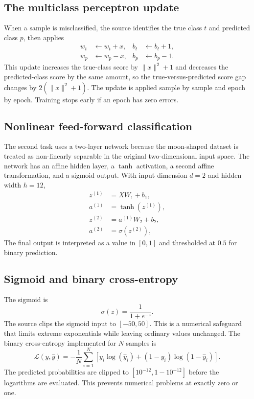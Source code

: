 \documentclass[11pt,a4paper]{article}
\begin{document}
\subsection{The multiclass perceptron update}
When a sample is misclassified, the source identifies the true class \(t\) and predicted class \(p\), then applies
\begin{align}
    w_t &\leftarrow w_t + x, & b_t &\leftarrow b_t + 1,\\
    w_p &\leftarrow w_p - x, & b_p &\leftarrow b_p - 1.
\end{align}
This update increases the true-class score by \(\lVert x\rVert^2+1\) and decreases the predicted-class score by the same amount, so the true-versus-predicted score gap changes by \(2(\lVert x\rVert^2+1)\). The update is applied sample by sample and epoch by epoch. Training stops early if an epoch has zero errors.

\subsection{Nonlinear feed-forward classification}
The second task uses a two-layer network because the moon-shaped dataset is treated as non-linearly separable in the original two-dimensional input space. The network has an affine hidden layer, a \(\tanh\) activation, a second affine transformation, and a sigmoid output. With input dimension \(d=2\) and hidden width \(h=12\),
\begin{align}
    z^{(1)} &= XW_1 + b_1,\\
    a^{(1)} &= \tanh\!\left(z^{(1)}\right),\\
    z^{(2)} &= a^{(1)}W_2 + b_2,\\
    a^{(2)} &= \sigma\!\left(z^{(2)}\right),
\end{align}
The final output is interpreted as a value in \([0,1]\) and thresholded at \(0.5\) for binary prediction.

\subsection{Sigmoid and binary cross-entropy}
The sigmoid is
\begin{equation}
    \sigma(z)=\frac{1}{1+e^{-z}}.
\end{equation}
The source clips the sigmoid input to \([-50,50]\). This is a numerical safeguard that limits extreme exponentials while leaving ordinary values unchanged. The binary cross-entropy implemented for \(N\) samples is
\begin{equation}
    \mathcal{L}(y,\hat{y})
    =-\frac{1}{N}\sum_{i=1}^{N}
    \left[y_i\log(\hat{y}_i)+(1-y_i)\log(1-\hat{y}_i)\right].
\end{equation}
The predicted probabilities are clipped to \([10^{-12},1-10^{-12}]\) before the logarithms are evaluated. This prevents numerical problems at exactly zero or one.
\end{document}
